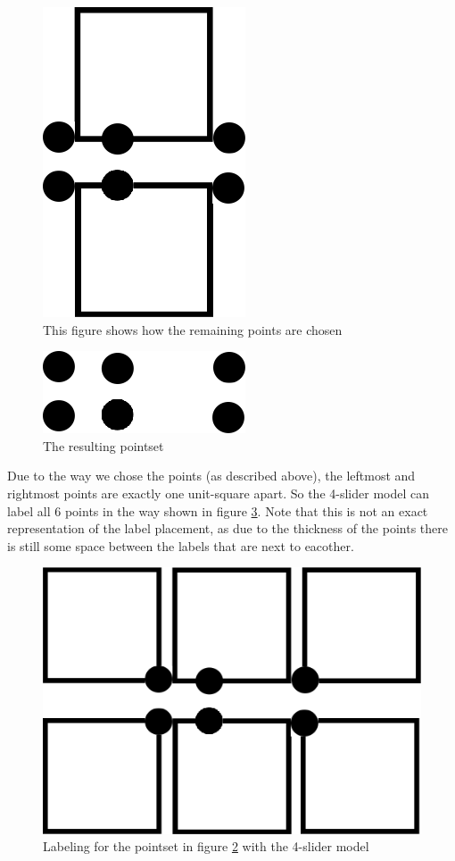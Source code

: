 \documentclass[a4paper,11pt]{article}
\begin{document}
\begin{figure}[H]
	\centering
	\includegraphics[scale=0.3]{4-3.png}
	\caption{This figure shows how the remaining points are chosen}
	\label{fig:pointplacement}
\end{figure}

\begin{figure}[H]
	\centering
	\includegraphics[scale=0.3]{4-2.png}
	\caption{The resulting pointset}
	\label{fig:pointset}
\end{figure}

Due to the way we chose the points (as described above), the leftmost and rightmost points are exactly one unit-square apart. So the 4-slider model can label all 6 points in the way shown in figure \ref{fig:labelplacement}. Note that this is not an exact representation of the label placement, as due to the thickness of the points there is still some space between the labels that are next to eacother.\\

\begin{figure}[H]
	\centering
	\includegraphics[scale=0.3]{4-4.png}
	\caption{Labeling for the pointset in figure \ref{fig:pointset} with the 4-slider model}
	\label{fig:labelplacement}
\end{figure}
\end{document}
